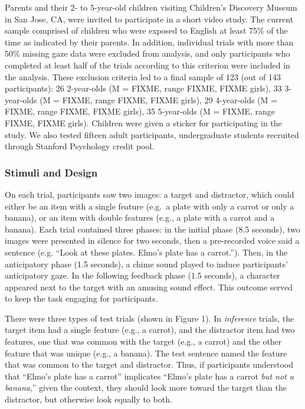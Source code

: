 \documentclass[a4paper,man,apacite,floatsintext]{apa6}
\begin{document}
Parents and their 2- to 5-year-old children visiting Children's
Discovery Museum in San Jose, CA, were invited to participate in a short
video study. The current sample comprised of children who were exposed
to English at least 75\% of the time as indicated by their parents. In
addition, individual trials with more than 50\% missing gaze data were
excluded from analysis, and only participants who completed at least
half of the trials according to this criterion were included in the
analysis. These exclusion criteria led to a final sample of 123 (out of
143 participants): 26 2-year-olds (M = FIXME, range FIXME, FIXME girls),
33 3-year-olds (M = FIXME, range FIXME, FIXME girls), 29 4-year-olds (M
= FIXME, range FIXME, FIXME girls), 35 5-year-olds (M = FIXME, range
FIXME, FIXME girls). Children were given a sticker for participating in
the study. We also tested fifteen adult participants, undergraduate
students recruited through Stanford Psychology credit pool.

\subsubsection{Stimuli and Design}\label{stimuli-and-design}

On each trial, participants saw two images: a target and distractor,
which could either be an item with a single feature (e.g.~a plate with
only a carrot or only a banana), or an item with double features (e.g.,
a plate with a carrot and a banana). Each trial contained three phases:
in the initial phase (8.5 seconds), two images were presented in silence
for two seconds, then a pre-recorded voice said a sentence (e.g. ``Look
at these plates. Elmo's plate has a carrot.''). Then, in the
anticipatory phase (1.5 seconds), a chime sound played to induce
participants' anticipatory gaze. In the following feedback phase (1.5
seconds), a character appeared next to the target with an amusing sound
effect. This outcome served to keep the task engaging for participants.

There were three types of test trials (shown in Figure 1). In
\emph{inference} trials, the target item had a single feature (e.g., a
carrot), and the distractor item had two features, one that was common
with the target (e.g., a carrot) and the other feature that was unique
(e.g., a banana). The test sentence named the feature that was common to
the target and distractor. Thus, if participants understood that
``Elmo's plate has a carrot'' implicates ``Elmo's plate has a carrot
\emph{but not a banana},'' given the context, they should look more
toward the target than the distractor, but otherwise look equally to
both.
\end{document}
